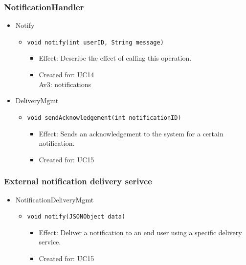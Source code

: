     \subsubsection{NotificationHandler}
        \begin{itemize}
            \item Notify
            \begin{itemize}
                \item \texttt{void notify(int userID, String message)}
                \begin{itemize}
                    \item Effect: Describe the effect of calling this operation.
                    \item Created for: UC14 \\
                          Av3: notifications
                \end{itemize}
            \end{itemize}

            \item DeliveryMgmt
            \begin{itemize}
                \item \texttt{void sendAcknowledgement(int notificationID)}
                \begin{itemize}
                    \item Effect: Sends an acknowledgement to the system for a certain notification.
                    \item Created for: UC15
                \end{itemize}
            \end{itemize}
        \end{itemize}

    \subsubsection{External notification delivery serivce}
        \begin{itemize}
            \item NotificationDeliveryMgmt
            \begin{itemize}
                \item \texttt{void notify(JSONObject data)}
                \begin{itemize}
                    \item Effect: Deliver a notification to an end user using a specific delivery service.
                    \item Created for: UC15
                \end{itemize}
            \end{itemize}
        \end{itemize}

